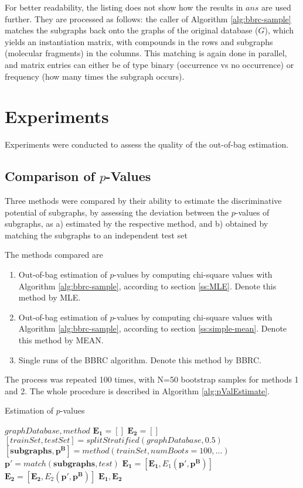 \documentclass{article}
\begin{document}
For better readability, the listing does not show how the results in $ans$ are used further. They are processed as follows: the caller of Algorithm \ref{alg:bbrc-sample} matches the subgraphs back onto the graphs of the original database ($G$), which yields an instantiation matrix, with compounds in the rows and subgraphs (molecular fragments) in the columns. This matching is again done in parallel, and matrix entries can either be of type binary (occurrence vs no occurrence) or frequency (how many times the subgraph occurs).

\section{Experiments}
Experiments were conducted to assess the quality of the out-of-bag estimation.

\subsection{Comparison of $p$-Values}
Three methods were compared by their ability to estimate the discriminative potential of subgraphs, by assessing the deviation between the $p$-values of subgraphs, as
a) estimated by the respective method, and 
b) obtained by matching the subgraphs to an independent test set

The methods compared are

\begin{enumerate}
  \item{Out-of-bag estimation of $p$-values by computing chi-square values with Algorithm \ref{alg:bbrc-sample}, according to section \ref{ss:MLE}. Denote this method by MLE.}
  \item{Out-of-bag estimation of $p$-values by computing chi-square values with Algorithm \ref{alg:bbrc-sample}, according to section \ref{ss:simple-mean}. Denote this method by MEAN.}
  \item{Single runs of the BBRC algorithm. Denote this method by BBRC.} 
\end{enumerate}

The process was repeated 100 times, with N=50 bootstrap samples for methods 1 and 2. The whole procedure is described in Algorithm \ref{alg:pValEstimate}.
\begin{algorithm}
  \caption{Estimation of $p$-values}
  \label{alg:pValEstimate}
\begin{algorithmic}[1]
  \Require $graphDatabase, method$ 
  \State $\mathbf{E_1}=\left[ \right]$
  \State $\mathbf{E_2}=\left[ \right]$
    \State $[trainSet, testSet] = splitStratified(graphDatabase,0.5)$ 
    \State $\left[ \mathbf{subgraphs}, \mathbf{p^B} \right] = method(trainSet,numBoots=100,\dots)$ 
    \State $\mathbf{p'} = match(\mathbf{subgraphs}, test)$ 
    \State $ \mathbf{E_1} = \left[ \mathbf{E_1}, E_1(\mathbf{p'}, \mathbf{p^B}) \right]$
    \State $ \mathbf{E_2} = \left[ \mathbf{E_2}, E_2(\mathbf{p'}, \mathbf{p^B}) \right]$
  \EndFor
  \Ensure $\mathbf{E_1},\mathbf{E_2}$
\end{algorithmic}
\end{algorithm}
\end{document}

